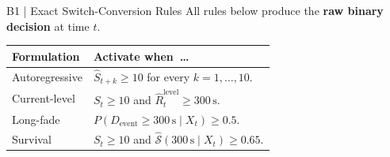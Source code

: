 
\begin{frame}[noframenumbering,label=backup-rules]{B1 | Exact Switch-Conversion Rules}
\small All rules below produce the \textbf{raw binary decision} at time $t$.\par
\vspace{3mm}
\renewcommand{\arraystretch}{1.65}
\begin{tabularx}{\textwidth}{@{}p{30mm}X@{}}
\toprule
Formulation & Activate when\ \ldots\\\midrule
\textcolor{forecast}{Autoregressive} & $\widehat S_{t+k}\geq10$ for every $k=1,\ldots,10$.\\
\textcolor{current}{Current-level} & $S_t\geq10$ and $\widehat R_t^{\mathrm{level}}\geq300\,\mathrm{s}$.\\
\textcolor{longfade}{Long-fade} & $P(D_{\mathrm{event}}\geq300\,\mathrm{s}\mid X_t)\geq0.5$.\\
\textcolor{survival}{Survival} & $S_t\geq10$ and $\widehat{\mathcal S}(300\,\mathrm{s}\mid X_t)\geq0.65$.\\
\bottomrule
\end{tabularx}
\end{frame}


